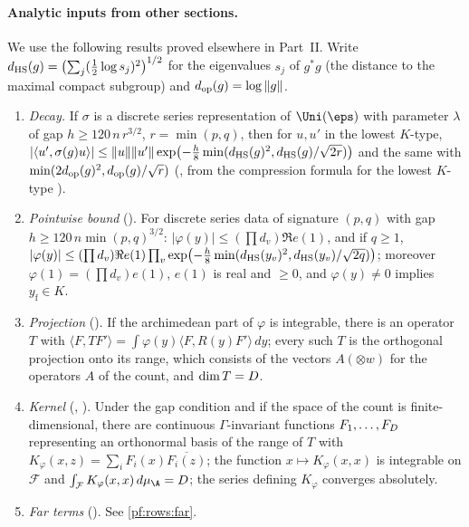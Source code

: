 \paragraph{Analytic inputs from other sections.}
We use the following results proved elsewhere in Part~II. Write $d_{\mathrm{HS}}(g)=\bigl(\sum_j(\frac12\log s_j)^2\bigr)^{1/2}$ for
the eigenvalues $s_j$ of $g^*g$ (the distance to the maximal compact subgroup) and $d_{\mathrm{op}}(g)=\log\|g\|$.
\begin{enumerate}[label=(S\arabic*)]
\item\label{pf:rows:S1} \emph{Decay.} If $\sigma$ is a discrete series representation of $\Uni(\eps)$ with parameter $\lambda$ of
gap $h\ge120\,n\,r^{3/2}$, $r=\min(p,q)$, then for $u,u'$ in the lowest $K$-type,
$|\langle u',\sigma(g)u\rangle|\le\|u\|\|u'\|\exp\bigl(-\frac h8\min(d_{\mathrm{HS}}(g)^2,d_{\mathrm{HS}}(g)/\sqrt{2r})\bigr)$ and the
same with $\min(2d_{\mathrm{op}}(g)^2,d_{\mathrm{op}}(g)/\sqrt r)$ (, from the
compression formula for the lowest $K$-type ).
\item\label{pf:rows:S2} \emph{Pointwise bound} (). For discrete series data
of signature $(p,q)$ with gap $h\ge120\,n\min(p,q)^{3/2}$: $|\varphi(y)|\le(\prod d_v)\Re e(1)$, and if $q\ge1$,
$|\varphi(y)|\le(\prod d_v)\Re e(1)\prod_v\exp\bigl(-\frac h8\min(d_{\mathrm{HS}}(y_v)^2,d_{\mathrm{HS}}(y_v)/\sqrt{2q})\bigr)$; moreover
$\varphi(1)=(\prod d_v)e(1)$, $e(1)$ is real and $\ge0$, and $\varphi(y)\ne0$ implies $y_{\mathrm f}\in K$.
\item\label{pf:rows:S3} \emph{Projection} (). If the archimedean part of
$\varphi$ is integrable, there is an operator $T$ with $\langle F,TF'\rangle=\int\varphi(y)\langle F,R(y)F'\rangle\,dy$; every such
$T$ is the orthogonal projection onto its range, which consists of the vectors $A(\otimes w)$ for the operators $A$ of the
count, and $\dim T=D$.
\item\label{pf:rows:S4} \emph{Kernel} (, ).
Under the gap condition and if the space of the count is finite-dimensional, there are continuous $\Gamma$-invariant
functions $F_1,\dots,F_{D}$ representing an orthonormal basis of the range of $T$ with
$K_\varphi(x,z)=\sum_iF_i(x)\overline{F_i(z)}$; the function $x\mapsto K_\varphi(x,x)$ is integrable on $\mathcal F$ and
$\int_{\mathcal F}K_\varphi(x,x)\,d\mu_{\A}=\rowsDc$; the series defining $K_\varphi$ converges absolutely.
\item\label{pf:rows:S5} \emph{Far terms} (). See \cref{pf:rows:far}.
\end{enumerate}

